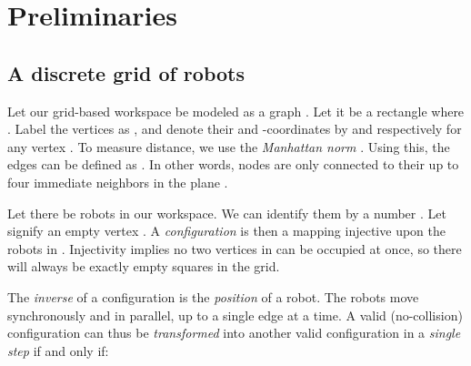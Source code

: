 \section{Preliminaries}

\subsection{A discrete grid of robots}

Let our grid-based workspace be modeled as a graph . Let it be a rectangle  where . 
Label the vertices as , and denote their  and  -coordinates by  and  respectively for any vertex .
To measure distance, we use the \emph{Manhattan norm} . Using this, the edges can be defined as . In other words, nodes are only connected to their up to four immediate neighbors in the plane .

Let there be   robots in our workspace. We can identify them by a number . Let \ilmath{\bot} signify an empty vertex . A \emph{configuration} is then a mapping  injective upon the robots in . Injectivity implies no two vertices in  can be occupied at once, so there will always be exactly  empty squares in the grid.

The \emph{inverse} of a configuration  \fda{,} is the \emph{position} of a robot.
The robots move synchronously and in parallel, up to a single edge at a time. A valid (no-collision) configuration  can thus be \emph{transformed} into another valid configuration  in a \emph{single step} if and only if:

